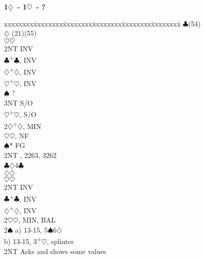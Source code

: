 \documentclass[10pt]{article}
\renewcommand{\c}{$\clubsuit$}
\renewcommand{\d}{$\diamondsuit$}
\newcommand{\h}{$\heartsuit$}
\newcommand{\s}{$\spadesuit$}
\newcommand{\p}{\textsuperscript{+}}
\newenvironment{bidtable}[1][]
{\textbf{#1}
  \begin{adjustwidth}{1em}{}
    \addvspace{2pt}
    \begin{tabbing}
      xxxxxxxx\=xxxxxxxx\=xxxxxxxx\=xxxxxxxx\=xxxxxxxx\=xxxxxxxx\=\kill}
{\end{tabbing}\end{adjustwidth}\bigskip}%
\begin{document}
\begin{multicols*}{2}
\begin{bidtable}[1\d\ - 1\h\ - ?]
                \>      \c      {}(54)                      \\
                \>      \d      \> (21)(55)                    \\
                \>      \h      {}\h                         \\
                \> 2NT  \> INV                                     \\
                \c  {}\p\c, INV                              \\
                \d  {}\p\d, INV                              \\
                \h  {}\p\h, INV                              \\
                \s  \> ?                                       \\
                \> 3NT  \> S/O                                     \\
                \h  {}\p\h, S/O                              \\
2\d             {}\p\d, MIN                                      \\
                \h  {}\h, NF                                 \\
                \s* \> FG                                      \\
                \>      \> 2NT      , 2263, 3262            \\
                \>      \c      {}\d 4\c                     \\
                \>      \d      {}\d                         \\
                \>      \h      {}\h                         \\
                \> 2NT  \> INV                                     \\
                \c  {}\p\c, INV                              \\
                \d  {}\p\d, INV                              \\
2\h             {}\h, MIN, BAL                                   \\
2\s             \> a) 13-15, 5\s 6\d                               \\
                \> b) 13-15, 3\p\h, splinter                       \\
                \> 2NT  \> Asks and shows some values              \\

\end{bidtable}
\end{multicols*}
\end{document}
